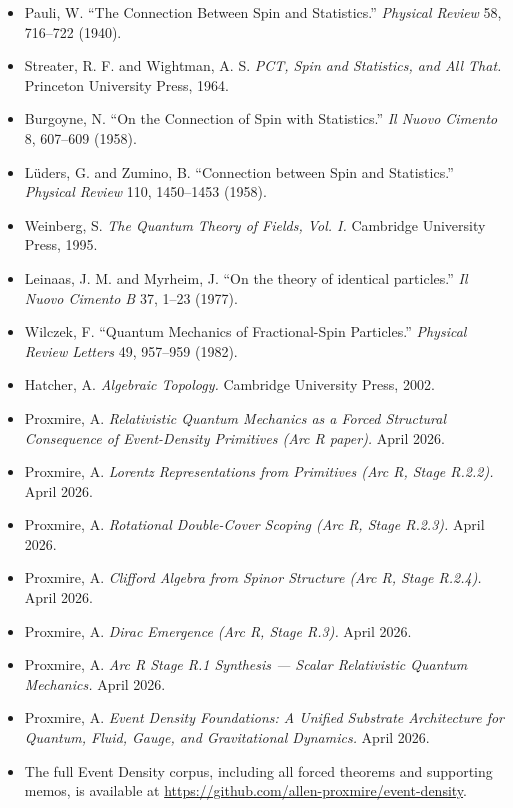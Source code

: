 \documentclass[11pt,a4paper]{article}
\begin{document}
\begin{itemize}[noitemsep]
\item Pauli, W. ``The Connection Between Spin and Statistics.'' \textit{Physical Review} 58, 716--722 (1940).
\item Streater, R. F. and Wightman, A. S. \textit{PCT, Spin and Statistics, and All That.} Princeton University Press, 1964.
\item Burgoyne, N. ``On the Connection of Spin with Statistics.'' \textit{Il Nuovo Cimento} 8, 607--609 (1958).
\item L\"uders, G. and Zumino, B. ``Connection between Spin and Statistics.'' \textit{Physical Review} 110, 1450--1453 (1958).
\item Weinberg, S. \textit{The Quantum Theory of Fields, Vol. I.} Cambridge University Press, 1995.
\item Leinaas, J. M. and Myrheim, J. ``On the theory of identical particles.'' \textit{Il Nuovo Cimento B} 37, 1--23 (1977).
\item Wilczek, F. ``Quantum Mechanics of Fractional-Spin Particles.'' \textit{Physical Review Letters} 49, 957--959 (1982).
\item Hatcher, A. \textit{Algebraic Topology.} Cambridge University Press, 2002.
\item Proxmire, A. \textit{Relativistic Quantum Mechanics as a Forced Structural Consequence of Event-Density Primitives (Arc R paper).} April 2026.
\item Proxmire, A. \textit{Lorentz Representations from Primitives (Arc R, Stage R.2.2).} April 2026.
\item Proxmire, A. \textit{Rotational Double-Cover Scoping (Arc R, Stage R.2.3).} April 2026.
\item Proxmire, A. \textit{Clifford Algebra from Spinor Structure (Arc R, Stage R.2.4).} April 2026.
\item Proxmire, A. \textit{Dirac Emergence (Arc R, Stage R.3).} April 2026.
\item Proxmire, A. \textit{Arc R Stage R.1 Synthesis --- Scalar Relativistic Quantum Mechanics.} April 2026.
\item Proxmire, A. \textit{Event Density Foundations: A Unified Substrate Architecture for Quantum, Fluid, Gauge, and Gravitational Dynamics.} April 2026.
\item The full Event Density corpus, including all forced theorems and supporting memos, is available at \url{https://github.com/allen-proxmire/event-density}.
\end{itemize}
\end{document}
